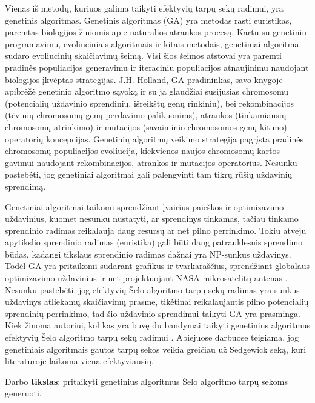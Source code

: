 \documentclass{VUMIFInfKursinis}
\begin{document}
Vienas iš metodų, kuriuos galima taikyti efektyvių tarpų sekų radimui, yra genetinis algoritmas.
Genetinis algoritmas (GA) yra metodas rasti euristikas, paremtas biologijos žiniomis apie natūralios atrankos procesą.
Kartu su genetiniu programavimu, evoliuciniais algoritmais ir kitais metodais, %
genetiniai algoritmai sudaro evoliucinių skaičiavimų šeimą.
Visi šios šeimos atstovai yra paremti pradinės populiacijos generavimu ir iteraciniu populiacijos atnaujinimu naudojant biologijos įkvėptas strategijas.
J.H. Holland, GA pradininkas, savo knygoje \cite{holland1992adaptation}
apibrėžė genetinio algoritmo sąvoką ir su ja glaudžiai susijusias
chromosomų (potencialių uždavinio sprendinių, išreikštų genų rinkiniu), bei
rekombinacijos (tėvinių chromosomų genų perdavimo palikuonims),
atrankos (tinkamiausių chromosomų atrinkimo) ir mutacijos (savaiminio chromosomos genų kitimo) operatorių koncepcijas.
Genetinių algoritmų veikimo strategija pagrįsta pradinės chromosomų populiacijos evoliucija, kiekvienos naujos chromosomų kartos
gavimui naudojant rekombinacijos, atrankos ir mutacijos operatorius.
Nesunku pastebėti, jog genetiniai algoritmai gali palengvinti tam tikrų rūšių uždavinių sprendimą.

Genetiniai algoritmai taikomi sprendžiant įvairius paieškos ir optimizavimo uždavinius, kuomet nesunku nustatyti, ar sprendinys tinkamas,
tačiau tinkamo sprendinio radimas reikalauja daug resursų ar net pilno perrinkimo.
Tokiu atveju apytikslio sprendinio radimas (euristika) gali būti daug patrauklesnis sprendimo būdas,
kadangi tikslaus sprendinio radimas dažnai yra NP-sunkus uždavinys.
Todėl GA yra pritaikomi sudarant grafikus ir tvarkaraščius,
sprendžiant globalaus optimizavimo uždavinius
ir net projektuojant NASA mikrosatelitų antenas \cite{hornby2006automated}.
Nesunku pastebėti, jog efektyvių Šelo algoritmo tarpų sekų radimas yra sunkus uždavinys atliekamų skaičiavimų prasme,
tikėtinai reikalaujantis pilno potencialių sprendinių perrinkimo,
tad šio uždavinio sprendimui taikyti GA yra prasminga.
Kiek žinoma autoriui, kol kas yra buvę du bandymai taikyti genetinius algoritmus efektyvių Šelo algoritmo tarpų sekų radimui \cite{simpson1999faster, roos2002genetic}.
Abiejuose darbuose teigiama, jog genetiniais algoritmais gautos tarpų sekos veikia greičiau už Sedgewick seką, kuri literatūroje laikoma viena efektyviausių.

\pagebreak

Darbo \textbf{tikslas}:
pritaikyti genetinius algoritmus Šelo algoritmo tarpų sekoms generuoti.
\end{document}
